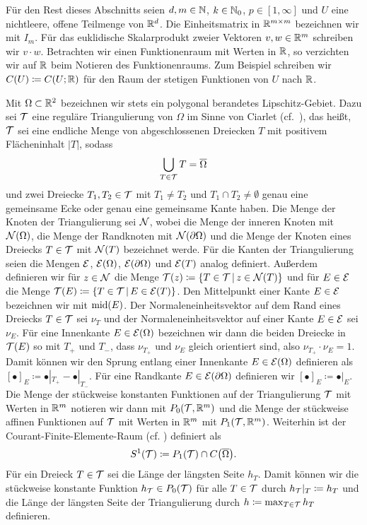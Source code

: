 Für den Rest dieses Abschnitts seien $d,m\in\mathbb{N}$, $k\in\mathbb{N}_0$,
$p\in[1,\infty]$ und $U$ eine nichtleere, offene Teilmenge von $\mathbb{R}^d$.
Die Einheitsmatrix in $\mathbb{R}^{m\times m}$ bezeichnen wir mit $I_m$.
Für das euklidische Skalarprodukt zweier Vektoren $v,w\in \mathbb{R}^m$ schreiben wir
$v\cdot w$.
Betrachten wir einen Funktionenraum mit Werten in $\mathbb{R}$, so verzichten wir auf
$\mathbb{R}$ beim Notieren des Funktionenraums. Zum Beispiel schreiben wir 
$C(U)\coloneqq C(U;\mathbb{R})$ für den Raum der stetigen Funktionen von $U$ nach
$\mathbb{R}$.

Mit $\Omega\subset\mathbb{R}^2$ bezeichnen wir stets ein polygonal berandetes
Lipschitz-Gebiet. 
Dazu sei $\mathcal{T}$ eine reguläre Triangulierung von $\Omega$ im Sinne von Ciarlet
(cf.\ \cites[34]{Car09b}[345]{CGR12}[S. 8 f.]{CGKNRR10}), das heißt, $\mathcal{T}$ sei
eine endliche Menge von abgeschlossenen Dreiecken $T$ mit positivem
Flächeninhalt $|T|$, sodass
\begin{align*}
  \bigcup_{T\in\mathcal{T}} T=\overline{\Omega}
\end{align*}
und zwei Dreiecke $T_1,T_2\in\mathcal{T}$ mit $T_1\neq T_2$ und $T_1\cap
T_2\neq\emptyset$ genau eine gemeinsame Ecke oder genau eine gemeinsame Kante
haben.
Die Menge der Knoten der Triangulierung sei $\mathcal{N}$, wobei die Menge der
inneren Knoten mit $\mathcal{N}(\Omega)$, die Menge der Randknoten mit
$\mathcal{N}(\partial\Omega)$ und die Menge der Knoten eines Dreiecks $T\in\mathcal{T}$ mit
$\mathcal{N}(T)$ bezeichnet werde. 
Für die Kanten der Triangulierung seien die Mengen $\mathcal{E}$, $\mathcal{E}(\Omega)$,
$\mathcal{E}(\partial\Omega)$ und $\mathcal{E}(T)$ analog definiert.  
Außerdem definieren wir für $z\in\mathcal{N}$ die Menge $\mathcal{T}(z)\coloneqq
\{T\in\mathcal{T}\,|\,z\in\mathcal{N}(T)\}$ und für $E\in\mathcal{E}$ die Menge
$\mathcal{T}(E)\coloneqq \{T\in\mathcal{T}\,|\,E\in\mathcal{E}(T)\}$. 
Den Mittelpunkt einer Kante $E\in\mathcal{E}$ bezeichnen wir mit $\textup{mid}(E)$.
Der Normaleneinheitsvektor auf dem Rand eines Dreiecks $T\in\mathcal{T}$ sei
$\nu_T$ und der Normaleneinheitsvektor auf einer Kante $E\in\mathcal{E}$ sei
$\nu_E$. 
Für eine Innenkante $E\in\mathcal{E}(\Omega)$ bezeichnen wir dann die beiden
Dreiecke in $\mathcal{T}(E)$  so mit $T_+$ und $T_-$, dass
$\nu_{T_+}$ und $\nu_E$ gleich orientiert sind, also $\nu_{T_+}\cdot\nu_E=1$.
Damit können wir den Sprung entlang einer Innenkante $E\in\mathcal{E}(\Omega)$
definieren als $[\bullet]_E\coloneqq \bullet|_{T_+} -\bullet|_{T_-}$.
Für eine Randkante $E\in\mathcal{E}(\partial\Omega)$ definieren wir
$[\bullet]_E\coloneqq \bullet|_E$.
Die Menge der stückweise konstanten Funktionen auf der Triangulierung $\mathcal{T}$
mit Werten in $\mathbb{R}^m$ notieren wir dann mit $ P_0\!\left(\mathcal{T},\mathbb{R}^m\right)$
und die Menge der stückweise affinen Funktionen auf $\mathcal{T}$ mit Werten in
$\mathbb{R}^m$ mit $ P_1\!\left(\mathcal{T},\mathbb{R}^m\right)$. 
Weiterhin ist der Courant-Finite-Elemente-Raum (cf. \cite[12]{CGKNRR10})
definiert als
\begin{align*}
  S^1(\mathcal{T})\coloneqq P_1(\mathcal{T})\cap C\!\left(\overline{\Omega}\right)\!.
\end{align*}
Für ein Dreieck $T\in\mathcal{T}$ sei die Länge der längsten Seite $h_T$. 
Damit können wir die stückweise konstante Funktion $h_{\mathcal{T}}\in P_0(\mathcal{T})$ für
alle $T\in\mathcal{T}$ durch $h_{\mathcal{T}}|_T\coloneqq h_T$ und die Länge der längsten
Seite der Triangulierung durch $h\coloneqq\max_{T\in\mathcal{T}}h_T$ definieren.

